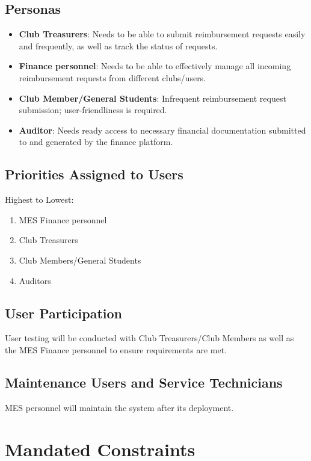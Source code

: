 \documentclass[12pt]{article}
\begin{document}
\subsection{Personas}
\begin{itemize}
    \item \textbf{Club Treasurers}: Needs to be able to submit reimbursement requests easily and frequently, as well as track the status of requests.
    \item \textbf{Finance personnel}: Needs to be able to effectively manage all incoming reimbursement requests from different clubs/users.
    \item \textbf{Club Member/General Students}: Infrequent reimbursement request submission; user-friendliness is required.
    \item \textbf{Auditor}: Needs ready access to necessary financial documentation submitted to and generated by the finance platform.
\end{itemize}

\subsection{Priorities Assigned to Users}
Highest to Lowest:
\begin{enumerate}
    \item MES Finance personnel
    \item Club Treasurers
    \item Club Members/General Students
    \item Auditors
\end{enumerate}

\subsection{User Participation}
User testing will be conducted with Club Treasurers/Club Members as well as the MES Finance personnel to ensure requirements are met.

\subsection{Maintenance Users and Service Technicians}
MES personnel will maintain the system after its deployment.


\section{Mandated Constraints}
\end{document}
